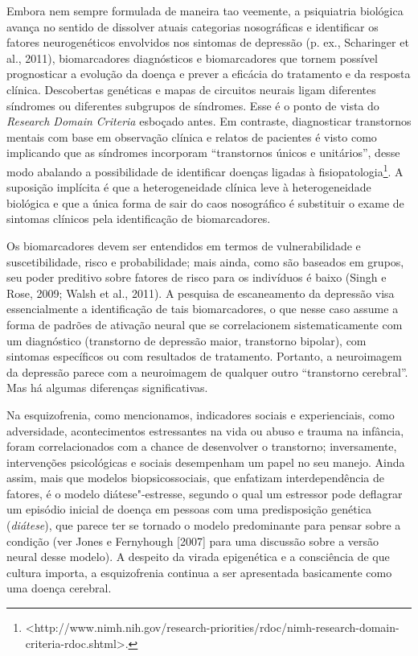 Embora nem sempre formulada de maneira tao veemente, a psiquiatria
biológica avança no sentido de dissolver atuais categorias nosográficas
e identificar os fatores neurogenéticos envolvidos nos sintomas de
depressão (p. ex., Scharinger et al., 2011), biomarcadores diagnósticos e
biomarcadores que tornem possível prognosticar a evolução da doença e
prever a eficácia do tratamento e da resposta clínica. Descobertas
genéticas e mapas de circuitos neurais ligam diferentes síndromes ou
diferentes subgrupos de síndromes. Esse é o ponto de vista do
\emph{Research Domain Criteria} esboçado antes. Em contraste,
diagnosticar transtornos mentais com base em observação clínica e
relatos de pacientes é visto como implicando que as síndromes incorporam
``transtornos únicos e unitários'', desse modo abalando a possibilidade
de identificar doenças ligadas à fisiopatologia\footnote[4]{\textless{}http://www.nimh.nih.gov/research-priorities/rdoc/nimh-research-domain-criteria-rdoc.shtml\textgreater{}.}. A
suposição implícita é que a heterogeneidade clínica leve à
heterogeneidade biológica e que a única forma de sair do caos
nosográfico é substituir o exame de sintomas clínicos pela identificação
de biomarcadores.

Os biomarcadores devem ser entendidos em termos de vulnerabilidade e
suscetibilidade, risco e probabilidade; mais ainda, como são baseados em
grupos, seu poder preditivo sobre fatores de risco para os indivíduos é
baixo (Singh e Rose, 2009; Walsh et al., 2011). A pesquisa de
escaneamento da depressão visa essencialmente a identificação de tais
biomarcadores, o que nesse caso assume a forma de padrões de ativação
neural que se correlacionem sistematicamente com um diagnóstico
(transtorno de depressão maior, transtorno bipolar), com sintomas
específicos ou com resultados de tratamento. Portanto, a neuroimagem da
depressão parece com a neuroimagem de qualquer outro ``transtorno
cerebral''. Mas há algumas diferenças significativas.

Na esquizofrenia, como mencionamos, indicadores sociais e experienciais,
como adversidade, acontecimentos estressantes na vida ou abuso e trauma
na infância, foram correlacionados com a chance de desenvolver o
transtorno; inversamente, intervenções psicológicas e sociais
desempenham um papel no seu manejo. Ainda assim, mais que modelos
biopsicossociais, que enfatizam interdependência de fatores, é o modelo
diátese"-estresse, segundo o qual um estressor pode deflagrar um episódio
inicial de doença em pessoas com uma predisposição genética
(\emph{diátese}), que parece ter se tornado o modelo predominante para
pensar sobre a condição (ver Jones e Fernyhough {[}2007{]} para uma
discussão sobre a versão neural desse modelo). A despeito da virada
epigenética e a consciência de que cultura importa, a esquizofrenia
continua a ser apresentada basicamente como uma doença cerebral.

